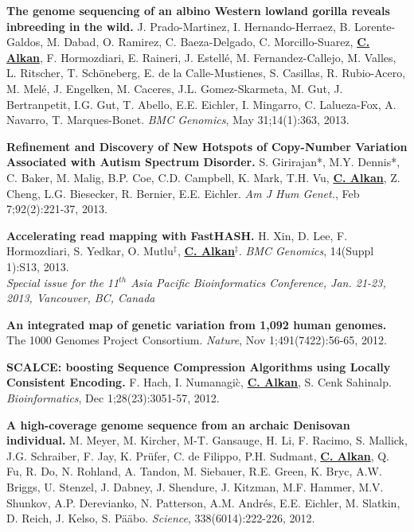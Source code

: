         
        \clearpage

\vspace{-.2cm}
        {\bf The genome sequencing of an albino Western lowland gorilla reveals inbreeding in the wild.}
        J. Prado-Martinez, I. Hernando-Herraez, B. Lorente-Galdos, M. Dabad, O. Ramirez, C. Baeza-Delgado, C. Morcillo-Suarez, 
        {\bf {\underline {C. Alkan}}}, F. Hormozdiari, E. Raineri, J. Estellé, M. Fernandez-Callejo, M. Valles, L. Ritscher, T. Schöneberg, E. de la Calle-Mustienes, 
        S. Casillas, R. Rubio-Acero, M. Melé, J. Engelken, M. Caceres, J.L. Gomez-Skarmeta, M. Gut, J. Bertranpetit, I.G. Gut, T. Abello, 
        E.E. Eichler, I. Mingarro, C. Lalueza-Fox, A. Navarro, T. Marques-Bonet.
        {\em BMC Genomics}, May 31;14(1):363, 2013.

        
 \vspace{-.2cm}
        {\bf Refinement and Discovery of New Hotspots of Copy-Number Variation Associated with Autism Spectrum Disorder.}
        S. Girirajan*, M.Y. Dennis*, C. Baker, M. Malig, B.P. Coe, C.D. Campbell, K. Mark, T.H. Vu,
        {\bf {\underline {C. Alkan}}}, Z. Cheng, L.G. Biesecker, R. Bernier, E.E. Eichler.
        {\em Am J Hum Genet.}, Feb 7;92(2):221-37, 2013.

 \vspace{-.2cm}
        {\bf Accelerating read mapping with FastHASH.}
        H. Xin, D. Lee, F. Hormozdiari, S. Yedkar, O. Mutlu$^\ddag$, {\bf {\underline {C. Alkan}}}$^\ddag$.
        {\em BMC Genomics}, 14(Suppl 1):S13, 2013.\\
        \hspace*{1cm} {\footnotesize {\it Special issue for the 11$^{th}$  Asia Pacific Bioinformatics Conference,
            Jan. 21-23, 2013, Vancouver, BC, Canada}}
        
 \vspace{-.2cm}
        {\bf An integrated map of genetic variation from 1,092 human genomes.}
        The 1000 Genomes Project Consortium. 
        {\em Nature}, Nov 1;491(7422):56-65, 2012.
        
 \vspace{-.2cm}
        {\bf SCALCE: boosting Sequence Compression Algorithms using Locally Consistent Encoding.}
        F. Hach, I. Numanagi\`{c}, {\bf {\underline {C. Alkan}}}, S. Cenk Sahinalp.  
        {\em Bioinformatics}, Dec 1;28(23):3051-57, 2012.

 \vspace{-.2cm}
        {\bf A high-coverage genome sequence from an archaic Denisovan individual.}
        M. Meyer, M. Kircher, M-T. Gansauge, H. Li, F. Racimo, S. Mallick, J.G. Schraiber, F. Jay, K. Pr\"{u}fer, C. de Filippo, P.H. Sudmant, 
        {\bf {\underline {C. Alkan}}}, Q. Fu, R. Do, N. Rohland, A. Tandon, M. Siebauer, R.E. Green, 
        K. Bryc, A.W. Briggs, U. Stenzel, J. Dabney, J. Shendure, J. Kitzman, M.F. Hammer, M.V. Shunkov, 
        A.P. Derevianko, N. Patterson, A.M. Andr\'{e}s, E.E. Eichler, M. Slatkin, D. Reich, J. Kelso, S. P\"{a}\"{a}bo. 
        {\em Science}, 338(6014):222-226, 2012.

